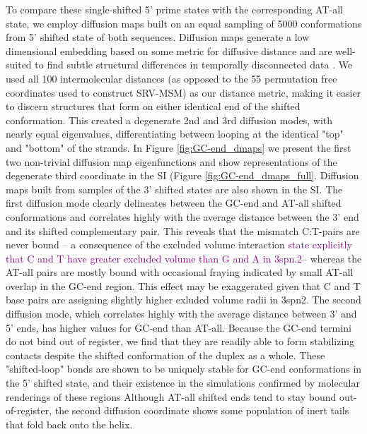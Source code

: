 \documentclass[journal=jpcbfk,manuscript=article]{achemso}
\begin{document}
To compare these single-shifted 5' prime states with the corresponding AT-all state, we employ diffusion maps built on an equal sampling of 5000 conformations from 5' shifted state of both sequences. Diffusion maps generate a low dimensional embedding based on some metric for diffusive distance and are well-suited to find subtle structural differences in temporally disconnected data \citep{Coifman2006DiffusionMaps, Ferguson2010SystematicMaps}. We used all 100 intermolecular distances (as opposed to the 55 permutation free coordinates used to construct SRV-MSM) as our distance metric, making it easier to discern structures that form on either identical end of the shifted conformation. This created a degenerate 2nd and 3rd diffusion modes, with nearly equal eigenvalues, differentiating between looping at the identical "top" and "bottom" of the strands. In Figure \ref{fig:GC-end_dmaps} we present the first two non-trivial diffusion map eigenfunctions and show representations of the degenerate third coordinate in the SI (Figure \ref{fig:GC-end_dmaps_full}. Diffusion maps built from samples of the 3' shifted states are also shown in the SI. The first diffusion mode clearly delineates between the GC-end and AT-all shifted conformations and correlates highly with the average distance between the 3' end and its shifted complementary pair. This reveals that the mismatch C:T-pairs are never bound -- a consequence of the excluded volume interaction \textcolor{purple}{state explicitly that C and T have greater excluded volume than G and A in 3spn.2}-- whereas the AT-all pairs are mostly bound with occasional fraying indicated by small AT-all overlap in the GC-end region. This effect may be exaggerated given that C and T base pairs are assigning slightly higher exluded volume radii in 3spn2. The second diffusion mode, which correlates highly with the average distance between 3' and 5' ends, has higher values for GC-end than AT-all. Because the GC-end termini do not bind out of register, we find that they are readily able to form stabilizing contacts despite the shifted conformation of the duplex as a whole. These "shifted-loop" bonds are shown to be uniquely stable for GC-end conformations in the 5' shifted state, and their existence in the simulations confirmed by molecular renderings of these regions Although AT-all shifted ends tend to stay bound out-of-register, the second diffusion coordinate shows some population of inert tails that fold back onto the helix.
\end{document}
